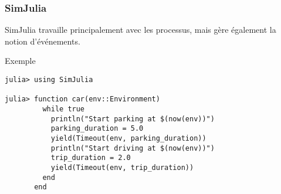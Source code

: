\documentclass[t,usepdftitle=false]{beamer}
\begin{document}
\begin{frame}[fragile]
\frametitle{SimJulia}

SimJulia travaille principalement avec les processus, mais gère également la notion d'événements.

\mbox{}

Exemple
\begin{verbatim}
julia> using SimJulia

julia> function car(env::Environment)
         while true
           println("Start parking at $(now(env))")
           parking_duration = 5.0
           yield(Timeout(env, parking_duration))
           println("Start driving at $(now(env))")
           trip_duration = 2.0
           yield(Timeout(env, trip_duration))
         end
       end
\end{verbatim}

\end{frame}
\end{document}

